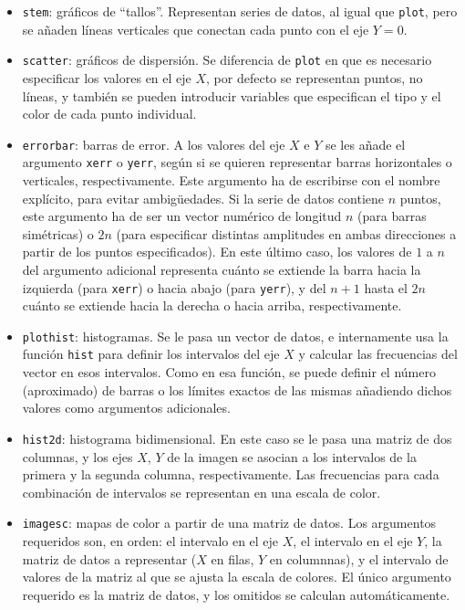 ﻿\documentclass{article}
\newcommand{\jl}{\texttt}
\begin{document}
\begin{itemize}
  \item \jl{stem}: gráficos de ``tallos''. Representan series de datos, al igual que \jl{plot}, pero se añaden líneas verticales que conectan cada punto con el eje $Y=0$.
  \item \jl{scatter}: gráficos de dispersión. Se diferencia de \jl{plot} en que es necesario especificar los valores en el eje $X$, por defecto se representan puntos, no líneas, y también se pueden introducir variables que especifican el tipo y el color de cada punto individual.
  \item \jl{errorbar}: barras de error. A los valores del eje $X$ e $Y$ se les añade el argumento \jl{xerr} o \jl{yerr}, según si se quieren representar barras horizontales o verticales, respectivamente. Este argumento ha de escribirse con el nombre explícito, para evitar ambigüedades. Si la serie de datos contiene $n$ puntos, este argumento ha de ser un vector numérico de longitud $n$ (para barras simétricas) o $2n$ (para especificar distintas amplitudes en ambas direcciones a partir de los puntos especificados). En este último caso, los valores de $1$ a $n$ del argumento adicional representa cuánto se extiende la barra hacia la izquierda (para \jl{xerr}) o hacia abajo (para \jl{yerr}), y del $n+1$ hasta el $2n$ cuánto se extiende hacia la derecha o hacia arriba, respectivamente.
  \item \jl{plothist}: histogramas. Se le pasa un vector de datos, e internamente usa la función \jl{hist} para definir los intervalos del eje $X$ y calcular las frecuencias del vector en esos intervalos. Como en esa función, se puede definir el número (aproximado) de barras o los límites exactos de las mismas añadiendo dichos valores como argumentos adicionales.
  \item\jl{hist2d}: histograma bidimensional. En este caso se le pasa una matriz de dos columnas, y los ejes $X$, $Y$ de la imagen se asocian a los intervalos de la primera y la segunda columna, respectivamente. Las frecuencias para cada combinación de intervalos se representan en una escala de color.
  \item\jl{imagesc}: mapas de color a partir de una matriz de datos. Los argumentos requeridos son, en orden: el intervalo en el eje $X$, el intervalo en el eje $Y$, la matriz de datos a representar ($X$ en filas, $Y$ en columnnas), y el intervalo de valores de la matriz al que se ajusta la escala de colores. El único argumento requerido es la matriz de datos, y los omitidos se calculan automáticamente.
\end{itemize}
\end{document}
